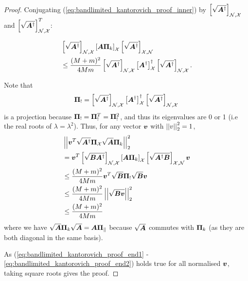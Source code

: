 \begin{proof}
    Conjugating (\ref{eq:bandlimited_kantorovich_proof_inner}) by $\msubgen[\set{N},\set{X}]{\sqrt{\matr{A}^{\dagger}}}$ and $\msubgen[\set{N},\set{X}]{\sqrt{\matr{A}^{\dagger}}}^{T}$:
    
    \begin{align}
        &\msubgen[\set{N},\set{X}]{\sqrt{\matr{A}^{\dagger}}}\msubgen[\set{X}]{\matr{A}\projgen{k}} \msubgen[\set{X},\set{N}]{\sqrt{\matr{A}^{\dagger}}} \\
        &\leq \frac{(M+m)^{2}}{4Mm} \msubgen[\set{N},\set{X}]{\sqrt{\matr{A}^{\dagger}}}\msubgen[\set{X}]{\matr{A}^{\dagger}}^{\dagger}\msubgen[\set{N},\set{X}]{\sqrt{\matr{A}^{\dagger}}}.
    \end{align}

    Note that 
    \begin{equation}
        \proj{!} = \msubgen[\set{N},\set{X}]{\sqrt{\matr{A}^{\dagger}}}\msubgen[\set{X}]{\matr{A}^{\dagger}}^{\dagger}\msubgen[\set{N},\set{X}]{\sqrt{\matr{A}^{\dagger}}}
    \end{equation}
    is a projection because $\proj{!} = \proj{!}^{T} = \proj{!}^{2}$, and thus its eigenvalues are 0 or 1 (i.e the real roots of $\lambda = \lambda^{2}$). Thus, for any vector $\bm{v}$ with $\left\lvert\left\lvert v\right\rvert\right\rvert^{2}_{2} = 1$,
    \begin{align}
    &\sqnormvec{\vect{v}^{T}\sqrt{\matr{A}^{\dagger}}\proj{X}\sqrt{\matr{A}}\projgen{k} } \label{eq:bandlimited_kantorovich_proof_end1}\\
        &=\vect{v}^{T}\msubgen[\set{N},\set{X}]{\sqrt{\matr{B}\matr{A}^{\dagger}}}\msubgen[\set{X}]{\matr{A}\projgen{k}} \msubgen[\set{X},\set{N}]{\sqrt{\matr{A}^{\dagger}\matr{B}}}\vect{v}\\
        &\leq \frac{(M+m)^{2}}{4Mm} \vect{v}^{T}\sqrt{\matr{B}}\proj{!}\sqrt{\matr{B}}\vect{v} \\
        &\leq \frac{(M+m)^{2}}{4Mm} \sqnormvec{\sqrt{\matr{B}\vect{v}}} \\
        &\leq \frac{(M+m)^{2}}{4Mm} \label{eq:bandlimited_kantorovich_proof_end2}
    \end{align}
    where we have $\sqrt{\matr{A}} \projgen{k} \sqrt{\matr{A}} = \matr{A}\proj{k}$ because $\sqrt{\bm{A}}$ commutes with $\projgen{k}$ (as they are both diagonal in the same basis).
    
    As (\ref{eq:bandlimited_kantorovich_proof_end1} - \ref{eq:bandlimited_kantorovich_proof_end2}) holds true for all normalised $\bm{v}$, taking square roots gives the proof.
\end{proof}



